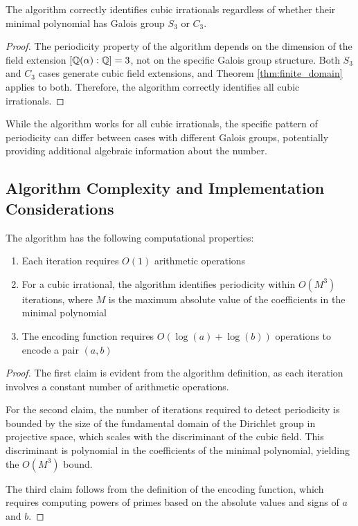 \begin{proposition}\label{prop:galois_behavior}
The \HAPD{} algorithm correctly identifies cubic irrationals regardless of whether their minimal polynomial has Galois group $S_3$ or $C_3$.
\end{proposition}

\begin{proof}
The periodicity property of the \HAPD{} algorithm depends on the dimension of the field extension $[\mathbb{Q}(\alpha):\mathbb{Q}] = 3$, not on the specific Galois group structure. Both $S_3$ and $C_3$ cases generate cubic field extensions, and Theorem \ref{thm:finite_domain} applies to both. Therefore, the algorithm correctly identifies all cubic irrationals.
\end{proof}

\begin{remark}
While the \HAPD{} algorithm works for all cubic irrationals, the specific pattern of periodicity can differ between cases with different Galois groups, potentially providing additional algebraic information about the number.
\end{remark}

\subsection{Algorithm Complexity and Implementation Considerations}

\begin{proposition}\label{prop:complexity}
The \HAPD{} algorithm has the following computational properties:
\begin{enumerate}
    \item Each iteration requires $O(1)$ arithmetic operations
    \item For a cubic irrational, the algorithm identifies periodicity within $O(M^3)$ iterations, where $M$ is the maximum absolute value of the coefficients in the minimal polynomial
    \item The encoding function requires $O(\log(a) + \log(b))$ operations to encode a pair $(a, b)$
\end{enumerate}
\end{proposition}

\begin{proof}
The first claim is evident from the algorithm definition, as each iteration involves a constant number of arithmetic operations.

For the second claim, the number of iterations required to detect periodicity is bounded by the size of the fundamental domain of the Dirichlet group in projective space, which scales with the discriminant of the cubic field. This discriminant is polynomial in the coefficients of the minimal polynomial, yielding the $O(M^3)$ bound.

The third claim follows from the definition of the encoding function, which requires computing powers of primes based on the absolute values and signs of $a$ and $b$.
\end{proof}

